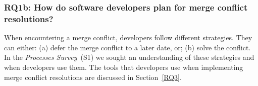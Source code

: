 \subsubsection{\textbf{RQ1b:} How do software developers \textbf{plan} for merge conflict resolutions?}\label{RQ1b}

When encountering a merge conflict, developers follow different strategies.
They can either: (a) defer the merge conflict to a later date, or; (b) solve the conflict.
In the \textit{Processes Survey}~(S1) we sought an understanding of these strategies and when developers use them.
The tools that developers use when implementing merge conflict resolutions are discussed in Section~\ref{RQ3}.


